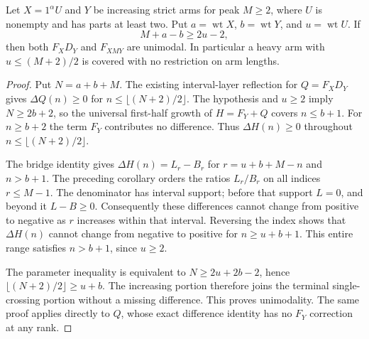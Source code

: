 \begin{theorem}
Let $X=1^\alpha U$ and $Y$ be increasing strict arms for peak $M\ge2$,
where $U$ is nonempty and has parts at least two. Put
$a=\operatorname{wt}X$, $b=\operatorname{wt}Y$, and
$u=\operatorname{wt}U$. If
\[
 M+a-b\ge2u-2,
\]
then both $F_XD_Y$ and $F_{XMY}$ are unimodal. In particular a heavy arm with
$u\le(M+2)/2$ is covered with no restriction on arm lengths.
\end{theorem}
\begin{proof}
Put $N=a+b+M$. The existing interval-layer reflection for
$Q=F_XD_Y$ gives $\Delta Q(n)\ge0$ for
$n\le\lfloor(N+2)/2\rfloor$. The hypothesis and $u\ge2$ imply
$N\ge2b+2$, so the universal first-half growth of $H=F_Y+Q$
covers $n\le b+1$.
For $n\ge b+2$ the term $F_Y$ contributes no difference. Thus
$\Delta H(n)\ge0$ throughout $n\le\lfloor(N+2)/2\rfloor$.

The bridge identity gives
$\Delta H(n)=L_r-B_r$ for $r=u+b+M-n$ and $n>b+1$.
The preceding corollary orders the ratios $L_r/B_r$ on all indices
$r\le M-1$. The denominator has interval support; before that
support $L=0$, and beyond it $L-B\ge0$. Consequently these
differences cannot change from positive to negative as $r$ increases
within that interval. Reversing the index shows that $\Delta H(n)$
cannot change from negative to positive for $n\ge u+b+1$.
This entire range satisfies $n>b+1$, since $u\ge2$.

The parameter inequality is equivalent to $N\ge2u+2b-2$, hence
$\lfloor(N+2)/2\rfloor\ge u+b$. The increasing portion therefore
joins the terminal single-crossing portion without a missing
difference. This proves unimodality.
The same proof applies directly to $Q$, whose exact difference
identity has no $F_Y$ correction at any rank.
\end{proof}

